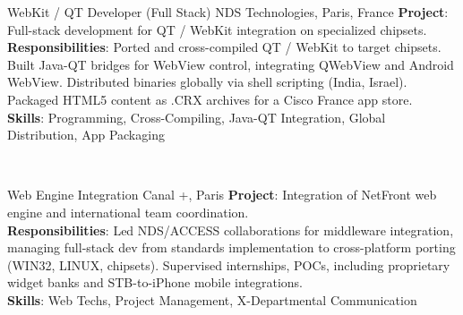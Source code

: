 \documentclass[
  a4paper,
   maincolor=cvblue,
   sectioncolor=cvblue,
]{fortysecondscv}
\begin{document}
\begin{cvtable}
    {WebKit / QT Developer (Full Stack)}
    {NDS Technologies, Paris, France}
    {
      \textbf{Project}: Full-stack development for QT / WebKit integration on specialized chipsets.\\
      \textbf{Responsibilities}:
          Ported and cross-compiled QT / WebKit to target chipsets. Built Java-QT bridges for WebView control, integrating QWebView and Android WebView. Distributed binaries globally via shell scripting (India, Israel). Packaged HTML5 content as .CRX archives for a Cisco France app store.\\
      \textbf{Skills}: Programming, Cross-Compiling, Java-QT Integration, Global Distribution, App Packaging\\
    }
\end{cvtable}
\\
\begin{cvtable}
    {Web Engine Integration}
    {Canal +, Paris}
    {
      \textbf{Project}: Integration of NetFront web engine and international team coordination.\\
      \textbf{Responsibilities}:
          Led NDS/ACCESS collaborations for middleware integration, managing full-stack dev from standards implementation to cross-platform porting (WIN32, LINUX, chipsets).
          Supervised internships, POCs, including proprietary widget banks and STB-to-iPhone mobile integrations.\\
      \textbf{Skills}: Web Techs, Project Management, X-Departmental Communication\\
    }
\end{cvtable}
\end{document}
